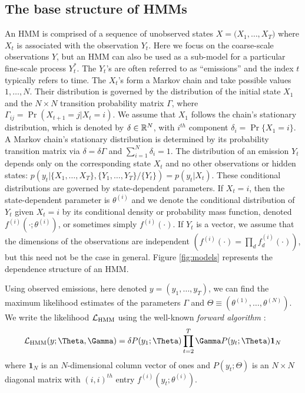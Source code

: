 \subsection{The base structure of HMMs}

An HMM is comprised of a sequence of unobserved states $X = \big(X_1, \ldots, X_T\big)$ where $X_t$ is associated with the observation $Y_t$. Here we focus on the coarse-scale observations $Y$, but an HMM can also be used as a sub-model for a particular fine-scale process $Y_t^*$. The $Y_t$'s are often referred to as ``emissions'' and the index $t$ typically refers to time. 
The $X_t$'s form a Markov chain and take possible values $1, \ldots, N$. Their distribution is governed by the distribution of the initial state $X_1$ and the $N \times N$ transition probability matrix $\Gamma$, where $\Gamma_{ij} = \Pr(X_{t+1} = j | X_t = i)$. 
%
We assume that $X_1$ follows the chain's stationary distribution, which is denoted by $\delta \in \mathbb{R}^N$, with $i^{th}$ component
$\delta_i = \Pr\{X_1 = i\}.$
A Markov chain's stationary distribution is determined by its probability transition matrix via $\delta = \delta \Gamma$ and $\sum_{i=1}^N \delta_i = 1$.
%
The distribution of an emission $Y_t$ depends only on the corresponding state $X_t$ and no other observations or hidden states: $p\left(y_t|\{X_1,\ldots, X_T\},\{Y_1,\ldots, Y_T\}/ \{Y_t\}\right) = p(y_t|X_t)$.
%
These conditional distributions are governed by state-dependent parameters. If $X_t = i$, then the state-dependent parameter is $\theta^{(i)}$ and we denote the conditional distribution of $Y_t$ given $X_t=i$ by its conditional density or probability mass function, denoted $f^{(i)}(\cdot ; \theta^{(i)})$, or sometimes simply $f^{(i)}(\cdot)$. If $Y_t$ is a vector, we assume that the dimensions of the observations are independent $\left(f^{(i)}(\cdot) = \prod_{d} f^{(i)}_d(\cdot)\right)$, but this need not be the case in general.
%
Figure \ref{fig:models} represents the dependence structure of an HMM.

Using observed emissions, here denoted $y = (y_1,\ldots,y_T)$, we can find the maximum likelihood estimates of the parameters $\Gamma$ and $\Theta \equiv (\theta^{(1)},\ldots,\theta^{(N)})$. We write the likelihood $\mathcal{L}_{\text{HMM}}$ using the  well-known \textit{forward algorithm} \citep{Zucchini:2016}:
%
$$\calL_{\text{HMM}}(y;\Theta,\Gamma) = \delta P(y_1;\Theta) \prod_{t=2}^T \Gamma P(y_t;\Theta) \mathbf{1}_N$$
%
where $\mathbf{1}_N$ is an $N$-dimensional column vector of ones and
%
$P(y_t;\Theta)$ is an $N \times N$ diagonal matrix with $(i,i)^{th}$ entry  $f^{(i)}(y_t; \theta^{(i)})$.
%

